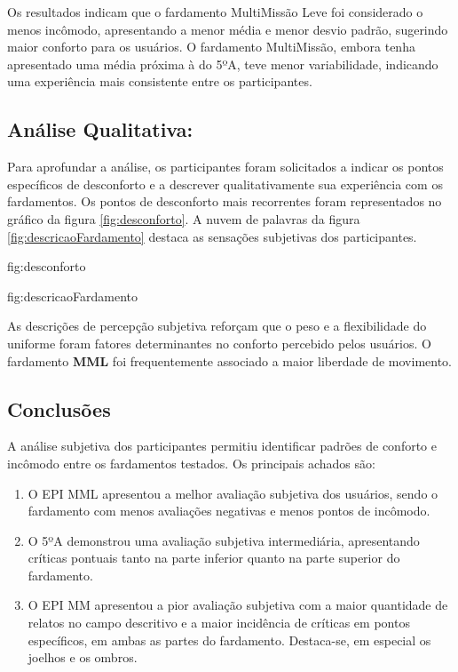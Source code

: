         Os resultados indicam que o fardamento MultiMissão Leve foi considerado o menos incômodo, 
        apresentando a menor média e menor desvio padrão, sugerindo maior conforto para os usuários. 
        O fardamento MultiMissão, embora tenha apresentado uma média próxima à do 5ºA, teve menor 
        variabilidade, indicando uma experiência mais consistente entre os participantes.
            


 
    \subsection{ Análise Qualitativa:}
        Para aprofundar a análise, os participantes foram solicitados a indicar os pontos específicos 
        de desconforto e a descrever qualitativamente sua experiência com os fardamentos. Os pontos 
        de desconforto mais recorrentes foram representados no gráfico da figura \ref{fig:desconforto}. 
        A nuvem de palavras da figura \ref{fig:descricaoFardamento} destaca as sensações subjetivas 
        dos participantes. 
        
        {fig:desconforto}

        {fig:descricaoFardamento}

        As descrições de percepção subjetiva reforçam que o peso e a flexibilidade do uniforme foram 
        fatores determinantes no conforto percebido pelos usuários. O fardamento \textbf{\acrlong{MML}} foi 
        frequentemente associado a maior liberdade de movimento.
    \subsection{Conclusões}
    A análise subjetiva dos participantes permitiu identificar padrões de conforto e incômodo entre 
    os fardamentos testados. Os principais achados são:

    \begin{enumerate}[label=\Roman*.] %
        \item O \acrshort{EPI} \acrlong{MML} apresentou a melhor avaliação subjetiva dos usuários, 
        sendo o fardamento com menos avaliações negativas e menos pontos de incômodo.
        \item O 5ºA demonstrou uma avaliação subjetiva intermediária, apresentando críticas 
        pontuais tanto na parte inferior quanto na parte superior do fardamento.
        \item O \acrshort{EPI} \acrlong{MM} apresentou a pior avaliação subjetiva 
        com a maior quantidade de relatos no campo descritivo e a maior incidência de críticas em 
        pontos específicos, em ambas as partes do fardamento. Destaca-se, em especial os joelhos 
        e os ombros.
        \end{enumerate}
